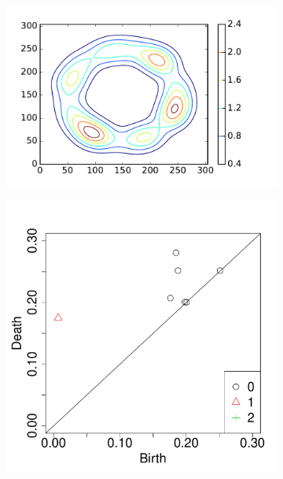 \documentclass[12pt]{article}
\begin{document}
\begin{figure}
\begin{subfigure}{.25\linewidth}
    \label{fig:example_contour1}
  \end{subfigure}
    \begin{subfigure}{.25\linewidth}
    \centering
    \caption{}  
        \includegraphics[width=\linewidth]{tmp3.pdf}
    \label{fig:example_contour2}
  \end{subfigure}
    \begin{subfigure}{.20\linewidth}
    \centering
    \caption{}  
        \includegraphics[width=\linewidth]{tmp5.pdf}
    \label{fig:example_pd}
  \end{subfigure}

\end{figure}
\end{document}
